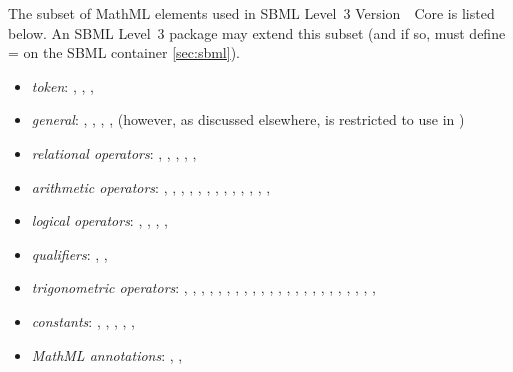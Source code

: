 The subset of MathML elements used in SBML Level~3 Version~\sbmlversionnum~Core is listed below.  An SBML Level~3 package may extend this subset (and if so, must define = on the SBML container \ref{sec:sbml}).
\begin{itemize}\setlength{\parskip}{-0.3ex}

\item \emph{token}: , , ,
  
\item \emph{general}: , ,
  , ,  (however, as
  discussed elsewhere,  is restricted to use in
  \FunctionDefinition)

\item \emph{relational operators}: , ,
  , , , 

\item \emph{arithmetic operators}: , ,
  , , , ,
  , , , ,
  , , ,

\item \emph{logical operators}: , ,
  , , 

\item \emph{qualifiers}: , ,

\item \emph{trigonometric operators}: , ,
  , , , ,
  , , , ,
  , , , ,
  , , , ,
  , , ,
  , , 

\item \emph{constants}: , ,
  , , ,

\item \emph{MathML annotations}: ,
  , 

\end{itemize}
\vspace*{-1ex}

